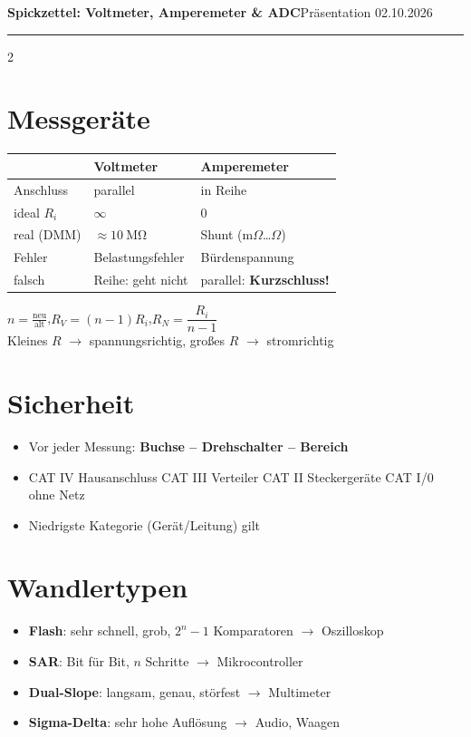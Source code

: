 \documentclass[11pt]{extarticle}
\begin{document}
{\Large\color{akzent}\textbf{Spickzettel: Voltmeter, Amperemeter \& ADC}}\hfill Präsentation 02.10.2026\par
\vspace{1mm}\hrule\vspace{2mm}


\begin{multicols}{2}
\section*{Messgeräte}
\small\begin{tabular}{@{}lll@{}}
\toprule
 & Voltmeter & Amperemeter\\ \midrule
Anschluss & parallel & in Reihe\\
ideal $R_i$ & $\infty$ & 0\\
real (DMM) & $\approx\SI{10}{\mega\ohm}$ & Shunt (m$\Omega$\dots$\Omega$)\\
Fehler & Belastungsfehler & Bürdenspannung\\
falsch & Reihe: geht nicht & parallel: \textbf{Kurzschluss!}\\
\bottomrule
\end{tabular}\normalsize

\smallskip
$n=\frac{\text{neu}}{\text{alt}}$,\quad $R_V=(n-1)R_i$,\quad $R_N=\dfrac{R_i}{n-1}$\\
Kleines $R$ $\to$ spannungsrichtig, großes $R$ $\to$ stromrichtig

\section*{Sicherheit}
\begin{itemize}
\item Vor jeder Messung: \textbf{Buchse -- Drehschalter -- Bereich}
\item CAT IV Hausanschluss \textbar{} CAT III Verteiler \textbar{} CAT II Steckergeräte \textbar{} CAT I/0 ohne Netz
\item Niedrigste Kategorie (Gerät/Leitung) gilt
\end{itemize}

\section*{Wandlertypen}
\begin{itemize}
\item \textbf{Flash}: sehr schnell, grob, $2^n-1$ Komparatoren $\to$ Oszilloskop
\item \textbf{SAR}: Bit für Bit, $n$ Schritte $\to$ Mikrocontroller
\item \textbf{Dual-Slope}: langsam, genau, störfest $\to$ Multimeter
\item \textbf{Sigma-Delta}: sehr hohe Auflösung $\to$ Audio, Waagen
\end{itemize}


\end{multicols}
\end{document}
